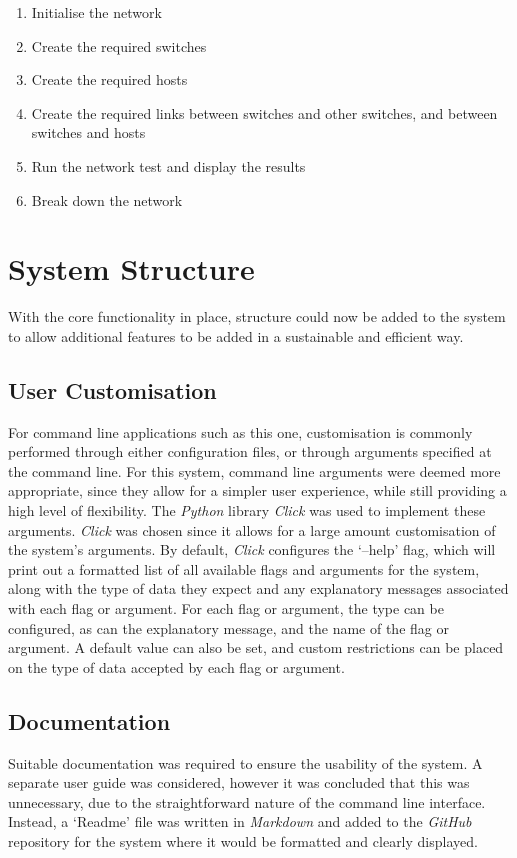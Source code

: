 \begin{enumerate}
  \item Initialise the network
  \item Create the required switches
  \item Create the required hosts
  \item Create the required links between switches and other switches, and between switches and hosts
  \item Run the network test and display the results
  \item Break down the network
\end{enumerate}

\section{System Structure}
\label{system_structure}
%

With the core functionality in place, structure could now be added to the system to allow additional features to be added in a sustainable and efficient way.

\subsection{User Customisation}
\label{user_customisation}
For command line applications such as this one, customisation is commonly performed through either configuration files, or through arguments specified at the command line.
For this system, command line arguments were deemed more appropriate, since they allow for a simpler user experience, while still providing a high level of flexibility.
The \textit{Python} library \textit{Click} \cite{python_click} was used to implement these arguments.
\textit{Click} was chosen since it allows for a large amount customisation of the system's arguments.
By default, \textit{Click} configures the `--help' flag, which will print out a formatted list of all available flags and arguments for the system, along with the type of data they expect and any explanatory messages associated with each flag or argument.
For each flag or argument, the type can be configured, as can the explanatory message, and the name of the flag or argument.
A default value can also be set, and custom restrictions can be placed on the type of data accepted by each flag or argument.

\subsection{Documentation}
\label{documentation}
Suitable documentation was required to ensure the usability of the system.
A separate user guide was considered, however it was concluded that this was unnecessary, due to the straightforward nature of the command line interface.
Instead, a `Readme' file was written in \textit{Markdown} \cite{markdown} and added to the \textit{GitHub} repository for the system where it would be formatted and clearly displayed.

